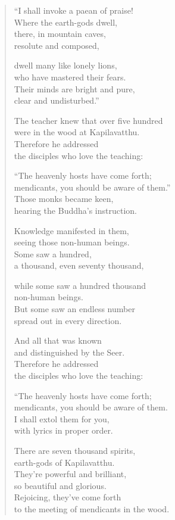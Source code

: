 \documentclass[12pt,openany]{book}%
\begin{document}
\begin{verse}%
“I shall invoke a paean of praise! \\
Where the earth-gods dwell, \\
there, in mountain caves, \\
resolute and composed, 

dwell many like lonely lions, \\
who have mastered their fears. \\
Their minds are bright and pure, \\
clear and undisturbed.” 

The teacher knew that over five hundred \\
were in the wood at Kapilavatthu. \\
Therefore he addressed \\
the disciples who love the teaching: 

“The heavenly hosts have come forth; \\
mendicants, you should be aware of them.” \\
Those monks became keen, \\
hearing the Buddha’s instruction. 

Knowledge manifested in them, \\
seeing those non-human beings. \\
Some saw a hundred, \\
a thousand, even seventy thousand, 

while some saw a hundred thousand \\
non-human beings. \\
But some saw an endless number \\
spread out in every direction. 

And all that was known \\
and distinguished by the Seer. \\
Therefore he addressed \\
the disciples who love the teaching: 

“The heavenly hosts have come forth; \\
mendicants, you should be aware of them. \\
I shall extol them for you, \\
with lyrics in proper order. 

There are seven thousand spirits, \\
earth-gods of Kapilavatthu. \\
They’re powerful and brilliant, \\
so beautiful and glorious. \\
Rejoicing, they’ve come forth \\
to the meeting of mendicants in the wood. 


\end{verse}
\end{document}

